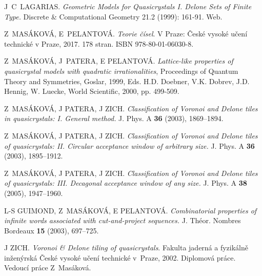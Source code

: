 \documentclass[text.tex]{subfiles}
\begin{document}
\begin{thebibliography}{9}

J~C~LAGARIAS. \emph{Geometric Models for Quasicrystals I. Delone Sets of Finite Type.} Discrete \& Computational Geometry 21.2 (1999): 161-91. Web.

Z~MASÁKOVÁ, E~PELANTOVÁ. \emph{Teorie čísel}. V Praze: České vysoké učení technické v Praze, 2017. 178 stran. ISBN 978-80-01-06030-8.

Z~MASÁKOVÁ, J~PATERA, E PELANTOVÁ. \emph{Lattice-like properties of quasicrystal models with quadratic irrationalities},  Proceedings of Quantum Theory and Symmetries, Goslar, 1999, Eds. H.D. Doebner, V.K. Dobrev, J.D. Hennig, W. Luecke, World Scientific, 2000, pp. 499-509.

	Z~MASÁKOVÁ, J PATERA, J ZICH. \emph{Classification of Voronoi and Delone tiles in quasicrystals: I. General method.} J. Phys. A \textbf{36} (2003), 1869--1894.

	Z~MASÁKOVÁ, J PATERA, J ZICH. \emph{Classification of Voronoi and Delone tiles of quasicrystals: II. Circular acceptance window of arbitrary size.} J. Phys. A \textbf{36} (2003), 1895--1912.

	Z~MASÁKOVÁ, J PATERA, J ZICH. \emph{Classification of Voronoi and Delone tiles of quasicrystals: III. Decagonal acceptance window of any size.} J. Phys. A \textbf{38} (2005), 1947--1960.

	L-S GUIMOND, Z~MASÁKOVÁ, E PELANTOVÁ. \emph{Combinatorial properties of infinite words associated with cut-and-project
 sequences.} J. Théor. Nombres Bordeaux \textbf{15} (2003), 697--725.
	
	J ZICH. \emph{Voronoi \& Delone tiling of quasicrystals}. Fakulta jaderná a fyzikálně inženýrská České vysoké učení technické v~Praze, 2002. Diplomová práce. Vedoucí práce Z~Masáková.
	
\end{thebibliography}
\end{document}

